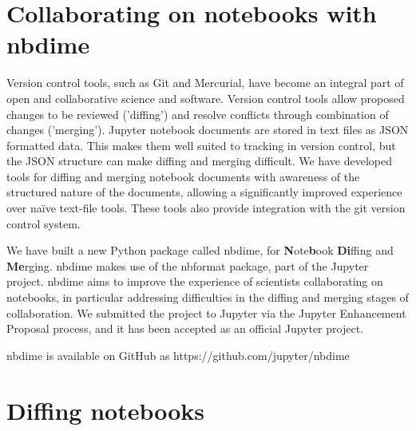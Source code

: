 \documentclass{deliverablereport}
\author{Benjamin Ragan-Kelley \& Martin Sandve Aln\ae{}s \& Vidar Fauske}
\begin{document}
    
\maketitle
\githubissuedescription

\section{Collaborating on notebooks with nbdime}

Version control tools, such as Git and Mercurial, have become an integral part of open and
collaborative science and software. Version control tools allow proposed changes to be reviewed
('diffing') and resolve conflicts through combination of changes ('merging'). Jupyter notebook
documents are stored in text files as JSON formatted data. This makes them well suited to tracking
in version control, but the JSON structure can make diffing and merging difficult.
We have developed tools for diffing and merging notebook documents with awareness of the structured
nature of the documents, allowing a significantly improved experience over naïve text-file tools.
These tools also provide integration with the git version control system.

We have built a new Python package called nbdime, for \textbf{N}ote\textbf{b}ook \textbf{Di}ffing and \textbf{Me}rging.
nbdime makes use of the nbformat package, part of the Jupyter project.
nbdime aims to improve the experience of scientists collaborating on notebooks,
in particular addressing difficulties in the diffing and merging stages of collaboration.
We submitted the project to Jupyter via the Jupyter Enhancement Proposal process,
and it has been accepted as an official Jupyter project.

nbdime is available on GitHub as https://github.com/jupyter/nbdime

\section{Diffing notebooks} %
\label{sec:diffing_notebooks}
\end{document}
